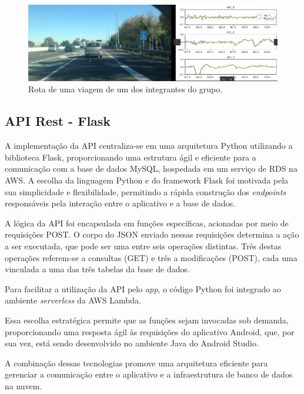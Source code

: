     \begin{figure}[hp]
        \centering
        
        \includegraphics[scale=0.6]{figures/rota_uah_driveset.jpg}
        
        \caption{Rota de uma viagem de um dos integrantes do grupo.}
        \label{fig:rota_uah_driveset}
    \end{figure}

    \subsection{API Rest - Flask}
    A implementação da API centraliza-se em uma arquitetura Python utilizando a biblioteca Flask, proporcionando uma estrutura ágil e eficiente para a comunicação com a base de dados MySQL, hospedada em um serviço de RDS na AWS. A escolha da linguagem Python e do framework Flask foi motivada pela sua simplicidade e flexibilidade, permitindo a rápida construção dos \textit{endpoints} responsáveis pela interação entre o aplicativo e a base de dados.

    A lógica da API foi encapsulada em funções específicas, acionadas por meio de requisições POST. O corpo do JSON enviado nessas requisições determina a ação a ser executada, que pode ser uma entre seis operações distintas. Três destas operações referem-se a consultas (GET) e três a modificações (POST), cada uma vinculada a uma das três tabelas da base de dados.

    Para facilitar a utilização da API pelo \textit{app}, o código Python foi integrado ao ambiente \textit{serverless} da AWS Lambda. 
    
    Essa escolha estratégica permite que as funções sejam invocadas sob demanda, proporcionando uma resposta ágil às requisições do aplicativo Android, que, por sua vez, está sendo desenvolvido no ambiente Java do Android Studio. 
    
    A combinação dessas tecnologias promove uma arquitetura eficiente para gerenciar a comunicação entre o aplicativo e a infraestrutura de banco de dados na nuvem.

